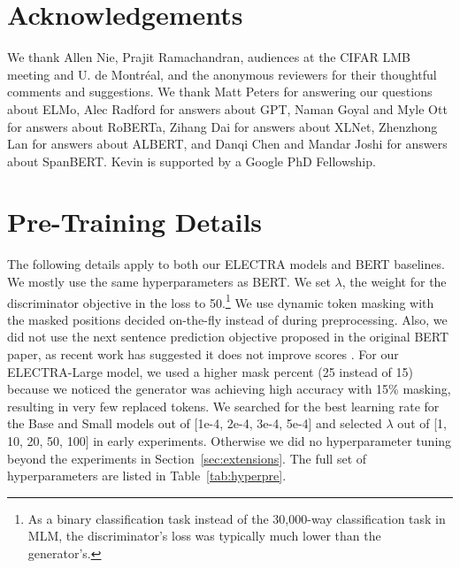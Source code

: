 \documentclass{article}
\begin{document}
\section*{Acknowledgements}
We thank Allen Nie, Prajit Ramachandran, audiences at the CIFAR LMB meeting and U. de Montr\'{e}al, and the anonymous reviewers for their thoughtful comments and suggestions. 
We thank Matt Peters for answering our questions about ELMo, Alec Radford for answers about GPT, Naman Goyal and Myle Ott for answers about RoBERTa, Zihang Dai for answers about XLNet, Zhenzhong Lan for answers about ALBERT, and Danqi Chen and Mandar Joshi for answers about SpanBERT. Kevin is supported by a Google PhD Fellowship.




\appendix

\section{Pre-Training Details}
\label{app:pre}
The following details apply to both our ELECTRA models and BERT baselines.
We mostly use the same hyperparameters as BERT.
We set $\lambda$, the weight for the discriminator objective in the loss to 50.\footnote{As a binary classification task instead of the 30,000-way classification task in MLM, the discriminator's loss was typically much lower than the generator's.}
We use dynamic token masking with the masked positions decided on-the-fly instead of during preprocessing.
Also, we did not use the next sentence prediction objective proposed in the original BERT paper, as recent work has suggested it does not improve scores \citep{yang2019xlnet,liu2019roberta}.
For our ELECTRA-Large model, we used a higher mask percent (25 instead of 15) because we noticed the generator was achieving high accuracy with 15\% masking, resulting in very few replaced tokens.
We searched for the best learning rate for the Base and Small models out of [1e-4, 2e-4, 3e-4, 5e-4] and selected $\lambda$ out of [1, 10, 20, 50, 100] in early experiments. Otherwise we did no hyperparameter tuning beyond the experiments in Section~\ref{sec:extensions}.
The full set of hyperparameters are listed in Table~\ref{tab:hyperpre}. 
\end{document}
